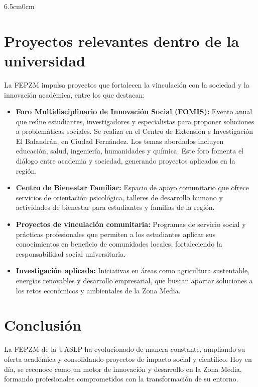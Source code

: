 \documentclass[10pt,twoside]{article}
\begin{document}
\begin{adjustwidth}{6.5cm}{0cm}
\section*{Proyectos relevantes dentro de la universidad}
La FEPZM impulsa proyectos que fortalecen la vinculación con la sociedad y la innovación académica, entre los que destacan:

\begin{itemize}
    \item \textbf{Foro Multidisciplinario de Innovación Social (FOMIS):} 
    Evento anual que reúne estudiantes, investigadores y especialistas para proponer soluciones a problemáticas sociales. Se realiza en el Centro de Extensión e Investigación El Balandrán, en Ciudad Fernández. Los temas abordados incluyen educación, salud, ingeniería, humanidades y química. Este foro fomenta el diálogo entre academia y sociedad, generando proyectos aplicados en la región.
    
    \item \textbf{Centro de Bienestar Familiar:} 
    Espacio de apoyo comunitario que ofrece servicios de orientación psicológica, talleres de desarrollo humano y actividades de bienestar para estudiantes y familias de la región.
    
    \item \textbf{Proyectos de vinculación comunitaria:} 
    Programas de servicio social y prácticas profesionales que permiten a los estudiantes aplicar sus conocimientos en beneficio de comunidades locales, fortaleciendo la responsabilidad social universitaria.
    
    \item \textbf{Investigación aplicada:} 
    Iniciativas en áreas como agricultura sustentable, energías renovables y desarrollo empresarial, que buscan aportar soluciones a los retos económicos y ambientales de la Zona Media.
\end{itemize}

\section*{Conclusión}
La FEPZM de la UASLP ha evolucionado de manera constante, ampliando su oferta académica y consolidando proyectos de impacto social y científico. Hoy en día, se reconoce como un motor de innovación y desarrollo en la Zona Media, formando profesionales comprometidos con la transformación de su entorno.




\end{adjustwidth}
\end{document}
